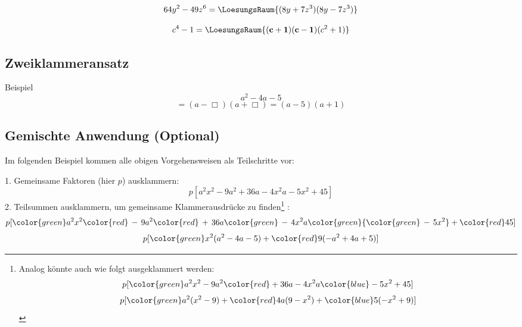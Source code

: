 $$64y^2 - 49z^6 = \LoesungsRaum{(8y+7z^3)(8y-7z^3)}$$

$$c^4 - 1 = \LoesungsRaum{\mathbf{(c+1)(c-1)}(c^2+1)}$$


\newpage



\subsection{Zweiklammeransatz}
Beispiel $$a^2-4a-5$$
$$=(a-\Box{})(a+\Box{}) = (a-5)(a+1)$$




\newpage
\subsection{Gemischte Anwendung (Optional)}
Im folgenden Beispiel kommen alle obigen Vorgehensweisen als
Teilschritte vor:

\begin{center}{}\end{center}


1. Gemeinsame Faktoren (hier $p$) ausklammern:
$$p[a^2x^2 - 9a^2 + 36a -4x^2a -5x^2 + 45]$$
2. Teilsummen ausklammern, um gemeinsame Klammerausdrücke zu finden\footnote{
Analog könnte auch wie folgt ausgeklammert werden:
$$p[{\color{green}a^2x^2 -9a^2} {\color{red}+ 36a -4x^2a} {\color{blue}- 5x^2 + 45}]$$
$$p[{\color{green}a^2}(x^2 - 9) + {\color{red}4a}(9 - x^2) + {\color{blue}5}(-x^2 + 9)]$$
}
:
$$p[{\color{green}a^2x^2 } {\color{red}\, -\, 9a^2} {\color{red}\, +\, 36a} {\color{green}\, -\, 4x^2a} {\color{green} {\color{green}\,-\,5x^2} } + {\color{red}45}]$$
$$p[{\color{green}x^2} (a^2 -4a -5) + {\color{red}9}(-a^2 + 4a +5)]$$

